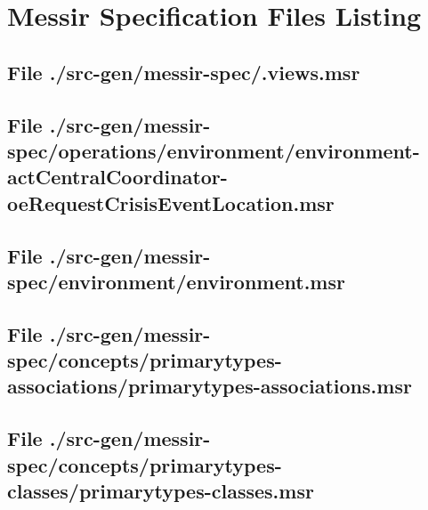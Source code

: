 \chapter{Messir Specification Files Listing}

\section[File /src-gen/messir-spec/.views.msr]{File ./src-gen/messir-spec/.views.msr}
\scriptsize

\normalsize
	
\section[File /.../environment-actCentralCoordinator-oeRequestCrisisEventLocation.msr]{File ./src-gen/messir-spec/operations/environment/environment-actCentralCoordinator-oeRequestCrisisEventLocation.msr}
\scriptsize

\normalsize
	
\section[File /src-gen/messir-spec/environment/environment.msr]{File ./src-gen/messir-spec/environment/environment.msr}
\scriptsize

\normalsize
	
\section[File /src-gen/messir-spec/concepts.../primarytypes-associations.msr]{File ./src-gen/messir-spec/concepts/primarytypes-associations/primarytypes-associations.msr}
\scriptsize

\normalsize
	
\section[File /src-gen/messir-spec/concepts/primarytypes-classes/primarytypes-classes.msr]{File ./src-gen/messir-spec/concepts/primarytypes-classes/primarytypes-classes.msr}
\scriptsize

\normalsize
	
